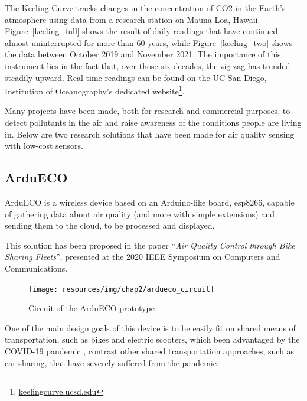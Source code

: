 		The Keeling Curve tracks changes in the concentration of CO2 in the Earth's atmosphere using data from a research station on Mauna Loa, Hawaii.
		Figure~\ref{keeling_full} shows the result of daily readings that have continued almost uninterrupted for more than 60 years, while Figure~\ref{keeling_two} shows the data between October 2019 and November 2021.
		The importance of this instrument lies in the fact that, over those six decades, the zig-zag has trended steadily upward. 
		Real time readings can be found on the UC San Diego, Institution of Oceanography's dedicated website\footnote{ \url{keelingcurve.ucsd.edu}}.
		
		Many projects have been made, both for research and commercial purposes, to detect pollutants in the air and raise awareness of the conditions people are living in.
		Below are two research solutions that have been made for air quality sensing with low-cost sensors.
			
		\subsection{ArduECO}\label{subsec:ardueco}
			
			ArduECO is a wireless device based on an Arduino-like board, esp8266, capable of gathering data about air quality (and more with simple extensions) and sending them to the cloud, to be processed and displayed.

			This solution has been proposed in the paper ``\textit{Air Quality Control through Bike Sharing Fleets}''\cite{ardueco_paper}, presented at the 2020 IEEE Symposium on Computers and Communications.
			
			\begin{figure}[h]
				\centering
				\texttt{[image: resources/img/chap2/ardueco\_circuit]}
				\caption{Circuit of the ArduECO prototype}
				\label{img:ardueco_circuit}
			\end{figure}
			
			One of the main design goals of this device is to be easily fit on shared means of transportation, such as bikes and electric scooters, which been advantaged by the COVID-19 pandemic \cite{HU2021102997}, contrast other shared transportation approaches, such as car sharing, that have severely suffered from the pandemic.
			
